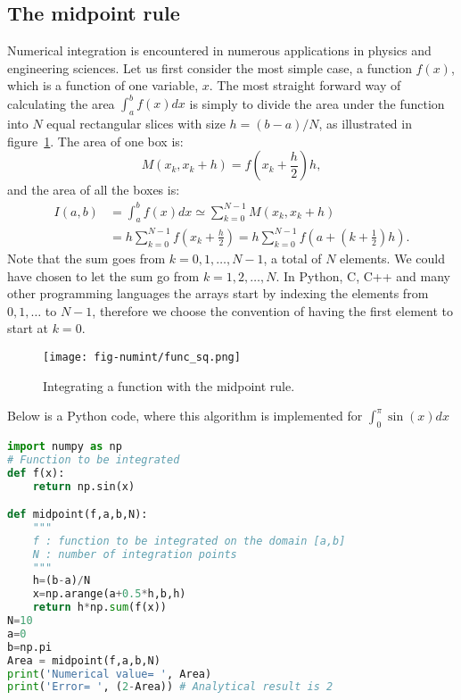\documentclass[graybox,sectrefs,envcountresetchap,open=right,final]{svmonodo}
\begin{document}
\subsection{The midpoint rule}
Numerical integration is encountered in numerous applications in physics and engineering sciences. 
Let us first consider the most simple case, a function $f(x)$, which is a function of one variable, $x$. The most straight forward way of calculating the area $\int_a^bf(x)dx$ is 
simply to divide the area under the function into $N$ equal rectangular slices with size $h=(b-a)/N$, as illustrated in figure~\ref{fig:numint:mid}. The area of one box is:
\begin{equation}
M(x_k,x_k+h)=f(x_k+\frac{h}{2}) h,\label{eq:numint:mid0}
\end{equation}
and the area of all the boxes is:
\begin{align}
I(a,b)&=\int_a^bf(x)dx\simeq\sum_{k=0}^{N-1}M(x_k,x_k+h)\nonumber\\ 
&=h\sum_{k=0}^{N-1}f(x_k+\frac{h}{2})=h\sum_{k=0}^{N-1}f(a+(k+\frac{1}{2})h).
\label{eq:numint:mid1}
\end{align}
Note that the sum goes from $k=0,1,\ldots,N-1$, a total of $N$ elements. We could have chosen to let the sum go from $k=1,2,\ldots,N$. 
In Python, C, C++ and many other programming languages the arrays start by indexing the elements from $0,1,\ldots$ to $N-1$, 
therefore we choose the convention of having the first element to start at $k=0$.

\begin{figure}[!ht]  %
  \centerline{\texttt{[image: fig-numint/func\_sq.png]}}
  \caption{
  Integrating a function with the midpoint rule. \label{fig:numint:mid}
  }
\end{figure}

Below is a Python code, where this algorithm is implemented for $\int_0^\pi\sin (x)dx$




















\begin{lstlisting}[language=python,style=blue1]
import numpy as np
# Function to be integrated
def f(x):
    return np.sin(x)

def midpoint(f,a,b,N):
    """
    f : function to be integrated on the domain [a,b]
    N : number of integration points
    """
    h=(b-a)/N
    x=np.arange(a+0.5*h,b,h)
    return h*np.sum(f(x))
N=10
a=0
b=np.pi
Area = midpoint(f,a,b,N)
print('Numerical value= ', Area)
print('Error= ', (2-Area)) # Analytical result is 2

\end{lstlisting}
\end{document}
